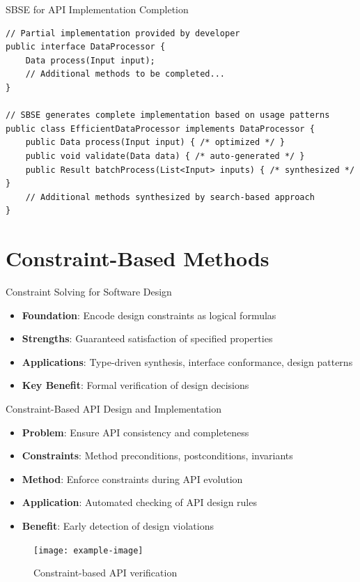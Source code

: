 \documentclass{beamer}
\begin{document}
\begin{frame}[fragile,t]{SBSE for API Implementation Completion}
\begin{verbatim}
// Partial implementation provided by developer
public interface DataProcessor {
    Data process(Input input);
    // Additional methods to be completed...
}

// SBSE generates complete implementation based on usage patterns
public class EfficientDataProcessor implements DataProcessor {
    public Data process(Input input) { /* optimized */ }
    public void validate(Data data) { /* auto-generated */ }
    public Result batchProcess(List<Input> inputs) { /* synthesized */ }
    // Additional methods synthesized by search-based approach
}
\end{verbatim}
\end{frame}

\section{Constraint-Based Methods}
\begin{frame}[t]{Constraint Solving for Software Design}
\begin{itemize}
\item \textbf{Foundation}: Encode design constraints as logical formulas
\item \textbf{Strengths}: Guaranteed satisfaction of specified properties
\item \textbf{Applications}: Type-driven synthesis, interface conformance, design patterns
\item \textbf{Key Benefit}: Formal verification of design decisions
\end{itemize}
\end{frame}

\begin{frame}[t]{Constraint-Based API Design and Implementation}
\begin{itemize}
\item \textbf{Problem}: Ensure API consistency and completeness
\item \textbf{Constraints}: Method preconditions, postconditions, invariants
\item \textbf{Method}: Enforce constraints during API evolution
\item \textbf{Application}: Automated checking of API design rules
\item \textbf{Benefit}: Early detection of design violations
\end{itemize}
\begin{figure}
\texttt{[image: example-image]}
\caption{Constraint-based API verification}
\end{figure}
\end{frame}
\end{document}

